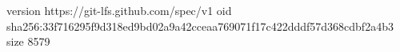 version https://git-lfs.github.com/spec/v1
oid sha256:33f716295f9d318ed9bd02a9a42cceaa769071f17c422dddf57d368cdbf2a4b3
size 8579
